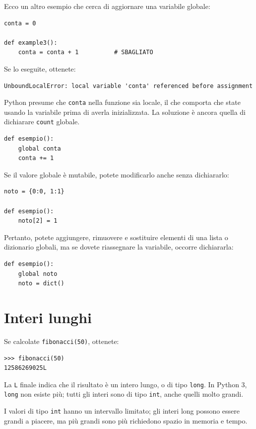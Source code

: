 \documentclass[10pt]{book}
\begin{document}
Ecco un altro esempio che cerca di aggiornare una variabile globale:

\begin{verbatim}
conta = 0

def example3():
    conta = conta + 1          # SBAGLIATO
\end{verbatim}
%
Se lo eseguite, ottenete:

\begin{verbatim}
UnboundLocalError: local variable 'conta' referenced before assignment
\end{verbatim}
%
Python presume che {\tt conta} nella funzione sia locale, il che comporta che state usando la variabile prima di averla inizializzata. La soluzione è ancora quella di dichiarare {\tt count} globale.

\begin{verbatim}
def esempio():
    global conta
    conta += 1
\end{verbatim}
%
Se il valore globale è mutabile, potete modificarlo anche senza dichiararlo:

\begin{verbatim}
noto = {0:0, 1:1}

def esempio():
    noto[2] = 1
\end{verbatim}
%
Pertanto, potete aggiungere, rimuovere e sostituire elementi di una lista o dizionario globali, ma se dovete riassegnare la variabile, occorre dichiararla:

\begin{verbatim}
def esempio():
    global noto
    noto = dict()
\end{verbatim}
%

\section{Interi lunghi}

Se calcolate {\tt fibonacci(50)}, ottenete:

\begin{verbatim}
>>> fibonacci(50)
12586269025L
\end{verbatim}
%
La {\tt L} finale indica che il risultato è un intero lungo, o di tipo {\tt long}.  In Python 3, {\tt long} non esiste più; tutti gli interi sono di tipo {\tt int}, anche quelli molto grandi.

I valori di tipo {\tt int} hanno un intervallo limitato; gli interi long possono essere grandi a piacere, ma più grandi sono più richiedono spazio in memoria e  tempo.
\end{document}
